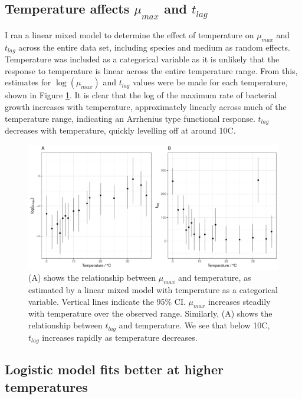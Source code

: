 \documentclass[11pt, a4paper]{article}
\begin{document}
\begin{linenumbers}
        \subsection{Temperature affects $\mu_{max}$ and $t_{lag}$}
        
         I ran a linear mixed model to determine the effect of temperature on $\mu_{max}$ and $t_{lag}$ across the entire data set, including species and medium as random effects. Temperature was included as a categorical variable as it is unlikely that the response to temperature is linear across the entire temperature range. From this, estimates for $\log(\mu_{max})$ and $t_{lag}$ values were be made for each temperature, shown in Figure \ref{fig:params_temp}. It is clear that the log of the maximum rate of bacterial growth increases with temperature, approximately linearly across much of the temperature range, indicating an Arrhenius type functional response. $t_{lag}$ decreases with temperature, quickly levelling off at around 10\degree C. 

                \begin{figure}[H]
        \includegraphics[width=\linewidth]{../results/tlags.pdf}
        \caption{(A) shows the relationship between $\mu_{max}$ and temperature, as estimated by a linear mixed model with temperature as a categorical variable. Vertical lines indicate the 95\% CI. $\mu_{max}$ increases steadily with temperature over the observed range. Similarly, (A) shows the relationship between $t_{lag}$ and temperature. We see that below 10\degree C, $t_{lag}$ increases rapidly as temperature decreases.   }
        \label{fig:params_temp}
        \end{figure}  



\subsection{Logistic model fits better at higher temperatures}


\end{linenumbers}
\end{document}
